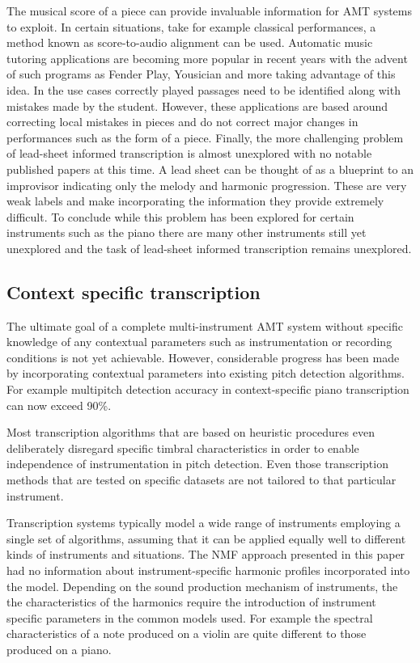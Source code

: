 The musical score of a piece can provide invaluable information for AMT systems
to exploit. In certain situations, take for example classical performances, a
method known as score-to-audio alignment can be used. \cite{Wang2017} Automatic
music tutoring applications are becoming more popular in recent years with the
advent of such programs as Fender Play, Yousician and more taking advantage of
this idea. In the use cases correctly played passages need to be identified
along with mistakes made by the student. However, these applications are based
around correcting local mistakes in pieces and do not correct major changes in
performances such as the form of a piece.  Finally, the more challenging problem
of lead-sheet informed transcription is almost unexplored with no notable
published papers at this time. A lead sheet can be thought of as a blueprint to
an improvisor indicating only the melody and harmonic progression. These are
very weak labels and make incorporating the information they provide extremely
difficult. To conclude while this problem has been explored for certain
instruments such as the piano there are many other instruments still yet
unexplored and the task of lead-sheet informed transcription remains unexplored.

\subsection{Context specific transcription}

The ultimate goal of a complete multi-instrument AMT system without specific
knowledge of any contextual parameters such as instrumentation or recording
conditions is not yet achievable. However, considerable progress has been made
by incorporating contextual parameters into existing pitch detection algorithms.
For example multipitch detection accuracy in context-specific piano
transcription can now exceed 90\%. \cite{context-dependent2016:Cogliati}

Most transcription algorithms that are based on heuristic procedures even
deliberately disregard specific timbral characteristics in order to enable
independence of instrumentation in pitch detection. Even those transcription
methods that are tested on specific datasets are not tailored to that particular
instrument.

Transcription systems typically model a wide range of instruments employing a
single set of algorithms, assuming that it can be applied equally well to
different kinds of instruments and situations. The NMF approach presented in
this paper had no information about instrument-specific harmonic profiles
incorporated into the model. Depending on the sound production mechanism of
instruments, the the characteristics of the harmonics require the introduction
of instrument specific parameters in the common models used. For example the
spectral characteristics of a note produced on a violin are quite different to
those produced on a piano.

